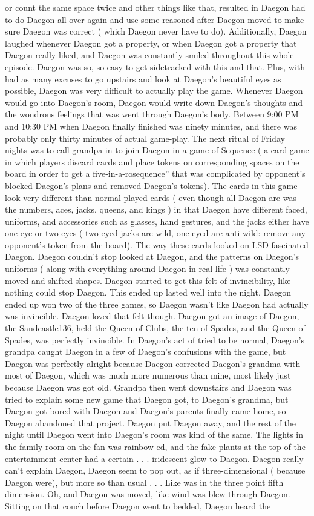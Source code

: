 \documentclass[12pt]{book}
\begin{document}
or count the same space twice and other things like that, resulted in Daegon had to do Daegon all over again and use some reasoned after Daegon moved to make sure Daegon was correct ( which Daegon never have to do). Additionally, Daegon laughed whenever Daegon got a property, or when Daegon got a property that Daegon really liked, and Daegon was constantly smiled throughout this whole episode. Daegon was so, so easy to get sidetracked with this and that. Plus, with had as many excuses to go upstairs and look at Daegon's beautiful eyes as possible, Daegon was very difficult to actually play the game. Whenever Daegon would go into Daegon's room, Daegon would write down Daegon's thoughts and the wondrous feelings that was went through Daegon's body. Between 9:00 PM and 10:30 PM when Daegon finally finished was ninety minutes, and there was probably only thirty minutes of actual game-play. The next ritual of Friday nights was to call grandpa in to join Daegon in a game of Sequence ( a card game in which players discard cards and place tokens on corresponding spaces on the board in order to get a five-in-a-rosequence'' that was complicated by opponent's blocked Daegon's plans and removed Daegon's tokens). The cards in this game look very different than normal played cards ( even though all Daegon are was the numbers, aces, jacks, queens, and kings ) in that Daegon have different faced, uniforms, and accessories such as glasses, hand gestures, and the jacks either have one eye or two eyes ( two-eyed jacks are wild, one-eyed are anti-wild: remove any opponent's token from the board). The way these cards looked on LSD fascinated Daegon. Daegon couldn't stop looked at Daegon, and the patterns on Daegon's uniforms ( along with everything around Daegon in real life ) was constantly moved and shifted shapes. Daegon started to get this felt of invincibility, like nothing could stop Daegon. This ended up lasted well into the night. Daegon ended up won two of the three games, so Daegon wasn't like Daegon had actually was invincible. Daegon loved that felt though. Daegon got an image of Daegon, the Sandcastle136, held the Queen of Clubs, the ten of Spades, and the Queen of Spades, was perfectly invincible. In Daegon's act of tried to be normal, Daegon's grandpa caught Daegon in a few of Daegon's confusions with the game, but Daegon was perfectly alright because Daegon corrected Daegon's grandma with most of Daegon, which was much more numerous than mine, most likely just because Daegon was got old. Grandpa then went downstairs and Daegon was tried to explain some new game that Daegon got, to Daegon's grandma, but Daegon got bored with Daegon and Daegon's parents finally came home, so Daegon abandoned that project. Daegon put Daegon away, and the rest of the night until Daegon went into Daegon's room was kind of the same. The lights in the family room on the fan was rainbow-ed, and the fake plants at the top of the entertainment center had a certain . . .  iridescent glow to Daegon. Daegon really can't explain Daegon, Daegon seem to pop out, as if three-dimensional ( because Daegon were), but more so than usual . . .  Like was in the three point fifth dimension. Oh, and Daegon was moved, like wind was blew through Daegon. Sitting on that couch before Daegon went to bedded, Daegon heard the 
\end{document}
